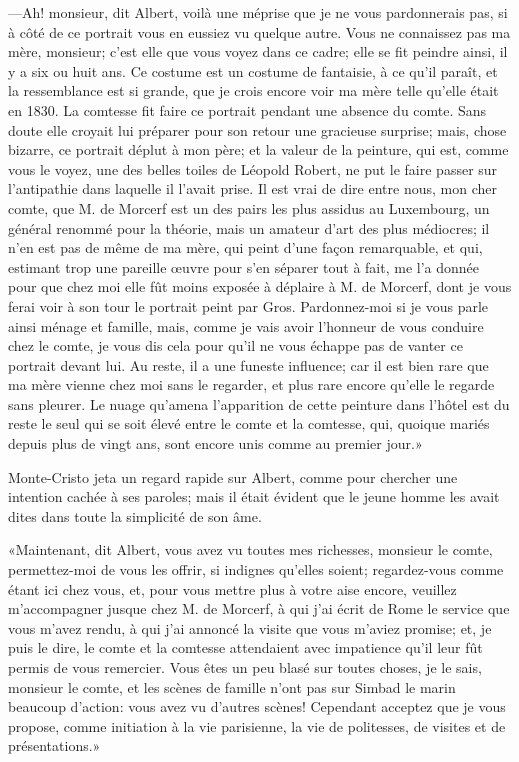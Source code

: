 —Ah! monsieur, dit Albert, voilà une méprise que je ne vous pardonnerais pas, si à côté de ce portrait vous en eussiez vu quelque autre. Vous ne connaissez pas ma mère, monsieur; c'est elle que vous voyez dans ce cadre; elle se fit peindre ainsi, il y a six ou huit ans. Ce costume est un costume de fantaisie, à ce qu'il paraît, et la ressemblance est si grande, que je crois encore voir ma mère telle qu'elle était en 1830. La comtesse fit faire ce portrait pendant une absence du comte. Sans doute elle croyait lui préparer pour son retour une gracieuse surprise; mais, chose bizarre, ce portrait déplut à mon père; et la valeur de la peinture, qui est, comme vous le voyez, une des belles toiles de Léopold Robert, ne put le faire passer sur l'antipathie dans laquelle il l'avait prise. Il est vrai de dire entre nous, mon cher comte, que M. de Morcerf est un des pairs les plus assidus au Luxembourg, un général renommé pour la théorie, mais un amateur d'art des plus médiocres; il n'en est pas de même de ma mère, qui peint d'une façon remarquable, et qui, estimant trop une pareille œuvre pour s'en séparer tout à fait, me l'a donnée pour que chez moi elle fût moins exposée à déplaire à M. de Morcerf, dont je vous ferai voir à son tour le portrait peint par Gros. Pardonnez-moi si je vous parle ainsi ménage et famille, mais, comme je vais avoir l'honneur de vous conduire chez le comte, je vous dis cela pour qu'il ne vous échappe pas de vanter ce portrait devant lui. Au reste, il a une funeste influence; car il est bien rare que ma mère vienne chez moi sans le regarder, et plus rare encore qu'elle le regarde sans pleurer. Le nuage qu'amena l'apparition de cette peinture dans l'hôtel est du reste le seul qui se soit élevé entre le comte et la comtesse, qui, quoique mariés depuis plus de vingt ans, sont encore unis comme au premier jour.» 

Monte-Cristo jeta un regard rapide sur Albert, comme pour chercher une intention cachée à ses paroles; mais il était évident que le jeune homme les avait dites dans toute la simplicité de son âme. 

«Maintenant, dit Albert, vous avez vu toutes mes richesses, monsieur le comte, permettez-moi de vous les offrir, si indignes qu'elles soient; regardez-vous comme étant ici chez vous, et, pour vous mettre plus à votre aise encore, veuillez m'accompagner jusque chez M. de Morcerf, à qui j'ai écrit de Rome le service que vous m'avez rendu, à qui j'ai annoncé la visite que vous m'aviez promise; et, je puis le dire, le comte et la comtesse attendaient avec impatience qu'il leur fût permis de vous remercier. Vous êtes un peu blasé sur toutes choses, je le sais, monsieur le comte, et les scènes de famille n'ont pas sur Simbad le marin beaucoup d'action: vous avez vu d'autres scènes! Cependant acceptez que je vous propose, comme initiation à la vie parisienne, la vie de politesses, de visites et de présentations.» 

